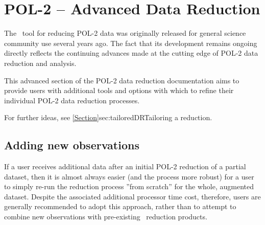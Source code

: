 \chapter{POL-2 -- Advanced Data Reduction}
\label{sec:advanced}


The \poltwomap\ tool for reducing POL-2 data was originally released for
general science community use several years ago. The fact that its
development remains ongoing directly reflects the continuing advances
made at the cutting edge of POL-2 data reduction and analysis.

This advanced section of the POL-2 data reduction documentation aims
to provide users with additional tools and options with which to refine their
individual POL-2 data reduction processes.

For further ideas, see \cref{Section}{sec:tailoredDR}{Tailoring a reduction}.

\section{Adding new observations}

If a user receives additional data after an initial POL-2 reduction of a partial dataset,
then it is almost always easier (and the process more robust) for a user to simply
re-run the reduction process ''from scratch'' for the whole, augmented dataset.
Despite the associated additional processor time cost, therefore, users are generally
recommended to adopt this approach, rather than to attempt to combine new
observations with pre-existing \poltwomap\ reduction products.

